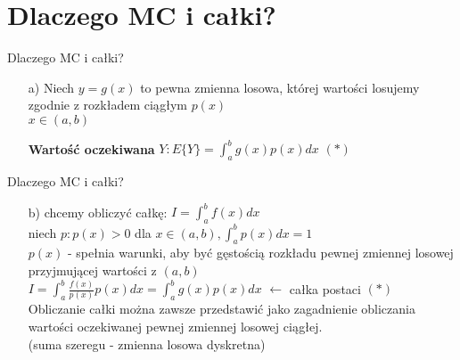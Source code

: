 \section{Dlaczego MC i całki?}
\begin{frame}{Dlaczego MC i całki?}
	\begin{enumerate}
		\item[a)]
		Niech $y = g(x)$ to pewna zmienna losowa, której 
		 wartości  losujemy zgodnie 
        z rozkładem  ciągłym  $p(x)$ \\
           $x\in (a,b)$
            
            
            {\bf Wartość oczekiwana} $Y: E\{Y\} = \int_a^b g(x) p(x) dx$ \hfill $(*)$
	\end{enumerate}
\end{frame}
\begin{frame}{Dlaczego MC i całki?}
	\begin{enumerate}
		\item[b)]
			chcemy obliczyć całkę: $I = \int_a^b f(x) dx$ \\
            niech $p: p(x) > 0$ dla $x \in (a, b), \int_a^b p(x) dx = 1$ \\
            $p(x)$ - spełnia warunki, aby być gęstością rozkładu pewnej zmiennej losowej przyjmującej wartości z $(a, b)$ \\
            $I = \int_a^b \frac{f(x)}{p(x)} p(x) dx = \int_a^b g(x)p(x)dx$ \hfill $\leftarrow$ całka postaci $(*)$ \\
            Obliczanie całki można zawsze przedstawić jako zagadnienie obliczania wartości oczekiwanej pewnej zmiennej losowej ciągłej.
            \\[8pt]
            (suma szeregu - zmienna losowa dyskretna)
	\end{enumerate}
\end{frame}